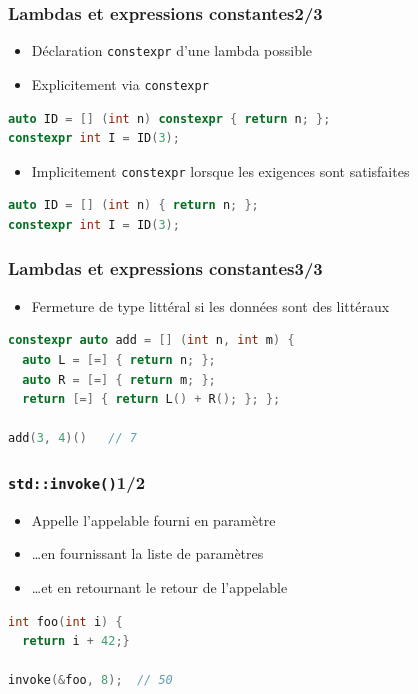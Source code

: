 \documentclass[C++.tex]{subfiles}
\begin{document}
\begin{frame}[fragile]
	\frametitle{Lambdas et expressions constantes\titlehfill{}2/3}
	\begin{itemize}
		\item Déclaration \lstinline|constexpr| d'une lambda possible 
		\item Explicitement via \lstinline|constexpr|
	\end{itemize}

	\begin{lstlisting}[language=C++]
auto ID = [] (int n) constexpr { return n; };
constexpr int I = ID(3);\end{lstlisting}

	\begin{itemize}
		\item Implicitement \lstinline|constexpr| lorsque les exigences sont satisfaites
	\end{itemize}


	\begin{lstlisting}[language=C++]
auto ID = [] (int n) { return n; };
constexpr int I = ID(3);\end{lstlisting}
\end{frame}

\begin{frame}[fragile]
	\frametitle{Lambdas et expressions constantes\titlehfill{}3/3}
	\begin{itemize}
		\item Fermeture de type littéral si les données sont des littéraux
	\end{itemize}

	\begin{lstlisting}[language=C++]
constexpr auto add = [] (int n, int m) {
  auto L = [=] { return n; };
  auto R = [=] { return m; };
  return [=] { return L() + R(); }; };

add(3, 4)()   // 7\end{lstlisting}
\end{frame}

\begin{frame}[fragile]
	\frametitle{\lstinline|std::invoke()|\titlehfill{}1/2}
	\begin{itemize}
		\item Appelle l'appelable fourni en paramètre
		\item \ldots en fournissant la liste de paramètres
		\item \ldots et en retournant le retour de l'appelable
	\end{itemize}

	\begin{lstlisting}[language=C++]
int foo(int i) {
  return i + 42;}

invoke(&foo, 8);  // 50\end{lstlisting}
\end{frame}
\end{document}
